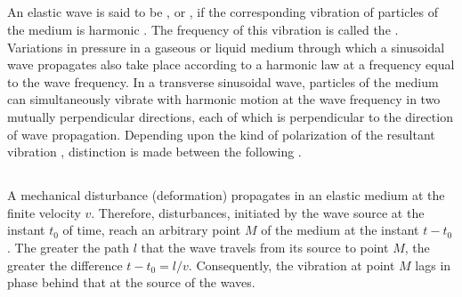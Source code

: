 \subsection{}\label{30.2.2} An elastic wave is said to be , or , if the corresponding vibration of particles of the medium is harmonic . The frequency of this vibration is called the . Variations in pressure in a gaseous or liquid medium through which a sinusoidal wave propagates also take place according to a harmonic law at a frequency equal to the wave frequency. In a transverse sinusoidal wave, particles of the medium can simultaneously vibrate with harmonic motion at the wave frequency in two mutually perpendicular directions, each of which is perpendicular to the direction of wave propagation. Depending upon the kind of polarization of the resultant vibration , distinction is made between the following .

\subsection{}\label{30.2.3} A mechanical disturbance (deformation) propagates in an elastic medium at the finite velocity $v$. Therefore, disturbances, initiated by the wave source at the instant $t_{0}$ of time, reach an arbitrary point $M$ of the medium at the instant $t - t_{0}$. The greater the path $l$ that the wave travels from its source to point $M$, the greater the difference $t - t_{0} = l/v$. Consequently, the vibration at point $M$ lags in phase behind that at the source of the waves.

